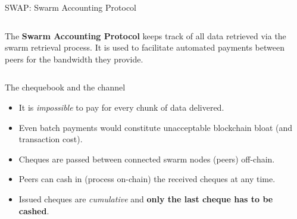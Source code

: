 \begin{frame}{SWAP: Swarm Accounting Protocol}
\begin{columns}[T]
\begin{column}{0.5\textwidth}
\small
The \textbf{Swarm Accounting Protocol} keeps track of all data retrieved via the swarm retrieval process. It is used to facilitate automated payments between peers for the bandwidth they provide.\\

\end{column}

\begin{column}{0.5\textwidth}
 \begin{center}
 \end{center}
\end{column}

\end{columns}
\end{frame}

\begin{frame}{The chequebook and the channel}
 \begin{itemize}
  \item It is \emph{impossible} to pay for every chunk of data delivered.
  \item<2-> Even batch payments would constitute unacceptable blockchain bloat (and transaction cost).
 \end{itemize}
  \begin{itemize}
  \item<4-> Cheques are passed between connected swarm nodes (peers) off-chain.
  \item<4-> Peers can cash in (process on-chain) the received cheques at any time.
  \item<4-> Issued cheques are \emph{cumulative} and \textbf{only the last cheque has to be cashed}.
 \end{itemize}
\end{frame}

